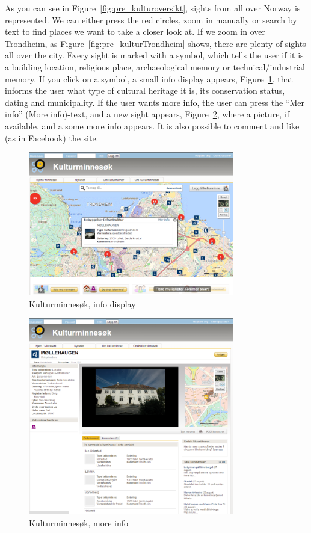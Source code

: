 \documentclass[11pt]{book}
\begin{document}
As you can see in Figure~\ref{fig:pre_kulturoversikt}, sights from all over Norway is represented. We can either press the red circles, zoom in manually or search by text to find places we want to take a closer look at. If we zoom in over Trondheim, as Figure~\ref{fig:pre_kulturTrondheim} shows, there are plenty of sights all over the city. Every sight is marked with a symbol, which tells the user if it is a building location, religious place, archaeological memory or technical/industrial memory. If you click on a symbol, a small info display appears, Figure~\ref{fig:pre_kulturInfo}, that informs the user what type of cultural heritage it is, its conservation status, dating and municipality. If the user wants more info, the user can press the ``Mer info'' (More info)-text, and  a new sight appears, Figure~\ref{fig:pre_kulturMoreInfo}, where a picture, if available, and a some more info appears. It is also possible to comment and like (as in Facebook) the site.

\begin{figure}[H]
      \centering
      \includegraphics[width=0.8\textwidth]{Figures/Prestudy/kulturminnesokClick.png}
      \caption{Kulturminnesøk, info display}
      \label{fig:pre_kulturInfo}
\end{figure}

\begin{figure}[H]
      \centering
      \includegraphics[width=0.8\textwidth]{Figures/Prestudy/kulturminnesokMoreInfo.png}
      \caption{Kulturminnesøk, more info}
      \label{fig:pre_kulturMoreInfo}
\end{figure}
\end{document}
